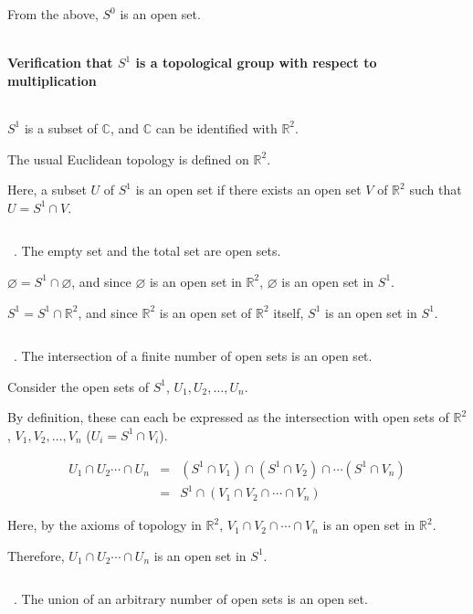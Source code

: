 \documentclass[uplatex,a4j,12pt,dvipdfmx]{jsarticle}
\begin{document}
From the above, $S^{0}$ is an open set.

	${}$

\paragraph{Verification that $S^{1}$ is a topological group with respect to multiplication}

${}$

$S^{1}$ is a subset of $\mathbb{C}$, and $\mathbb{C}$ can be identified with $\mathbb{R}^{2}$.

The usual Euclidean topology is defined on $\mathbb{R}^{2}$.

Here, a subset $U$ of $S^{1}$ is an open set if there exists an open set $V$ of $\mathbb{R}^{2}$ such that $U=S^{1} \cap V$.

	${}$

\ . The empty set and the total set are open sets.

$\varnothing = S^{1} \cap \varnothing$, and since $\varnothing$ is an open set in $\mathbb{R}^{2}$,
$\varnothing$ is an open set in $S^{1}$.

$S^{1} = S^{1} \cap \mathbb{R}^{2}$, and since $\mathbb{R}^{2}$ is an open set of $\mathbb{R}^{2}$ itself,
$S^{1}$ is an open set in $S^{1}$.

	${}$

\ . The intersection of a finite number of open sets is an open set.

Consider the open sets of $S^{1}$,
$U_{1}, U_{2} , \dots , U_{n}$.

By definition, these can each be expressed as the intersection with open sets of $\mathbb{R}^{2}$,
$V_{1}, V_{2} , \dots , V_{n}$ ($U_{i} = S^{1} \cap V_{i}$).

\[
	\begin{array}{rcl}
		U_{1} \cap U_{2} \cdots \cap U_{n}
		 & = &
		(S^{1} \cap V_{1}) \cap (S^{1} \cap V_{2}) \cap \cdots (S^{1} \cap V_{n})
		\\
		 & = &
		S^{1} \cap ( V_{1} \cap  V_{2} \cap \cdots \cap V_{n})
	\end{array}
\]

Here, by the axioms of topology in $\mathbb{R}^{2}$,
$V_{1} \cap  V_{2} \cap \cdots \cap V_{n}$
is an open set in $\mathbb{R}^{2}$.

Therefore,
$U_{1} \cap U_{2} \cdots \cap U_{n}$
is an open set in $S^{1}$.


	${}$

\ . The union of an arbitrary number of open sets is an open set.
\end{document}
